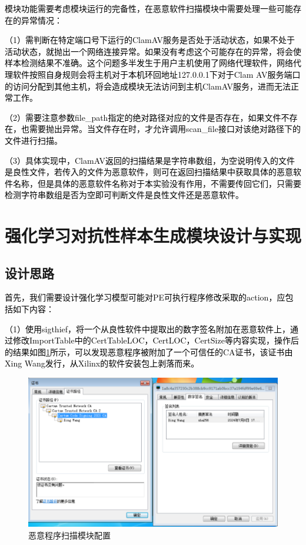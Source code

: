 \textcolor{black}{模块功能需要考虑模块运行的完备性，在恶意软件扫描模块中需要处理一些可能存在的异常情况：}

\textcolor{black}{（1）需判断在特定端口号下运行的ClamAV服务是否处于活动状态，如果不处于活动状态，就抛出一个网络连接异常。如果没有考虑这个可能存在的异常，将会使样本检测结果不准确。这个问题多半发生于用户主机使用了网络代理软件，网络代理软件按照自身规则会将主机对于本机环回地址127.0.0.1下对于Clam AV服务端口的访问分配到其他主机，将会造成模块无法访问到主机ClamAV服务，进而无法正常工作。}

\textcolor{black}{（2）需要注意参数file\_path指定的绝对路径对应的文件是否存在，如果文件不存在，也需要抛出异常。当文件存在时，才允许调用scan\_file接口对该绝对路径下的文件进行扫描。}

\textcolor{black}{（3）具体实现中，ClamAV返回的扫描结果是字符串数组，为空说明传入的文件是良性文件，若传入的文件为恶意软件，则可在返回扫描结果中获取具体的恶意软件名称，但是具体的恶意软件名称对于本实验没有作用，不需要传回它们，只需要检测字符串数组是否为空即可判断文件是良性文件还是恶意软件。}

\section{强化学习对抗性样本生成模块设计与实现}

\subsection{设计思路}

\textcolor{black}{首先，我们需要设计强化学习模型可能对PE可执行程序修改采取的action，应包括如下内容：}

\textcolor{black}{（1）使用sigthief，将一个从良性软件中提取出的数字签名附加在恶意软件上，通过修改ImportTable中的CertTableLOC，CertLOC，CertSize等内容实现，操作后的结果如图\ref{fig:certification_fabrication}所示，可以发现恶意程序被附加了一个可信任的CA证书，该证书由Xing Wang发行，从Xilinx的软件安装包上剥落而来。}

\begin{figure}
  \centering
  \includegraphics[]{images/certification_fabrication.png}
  \caption{恶意程序扫描模块配置}\label{fig:certification_fabrication}
\end{figure}

